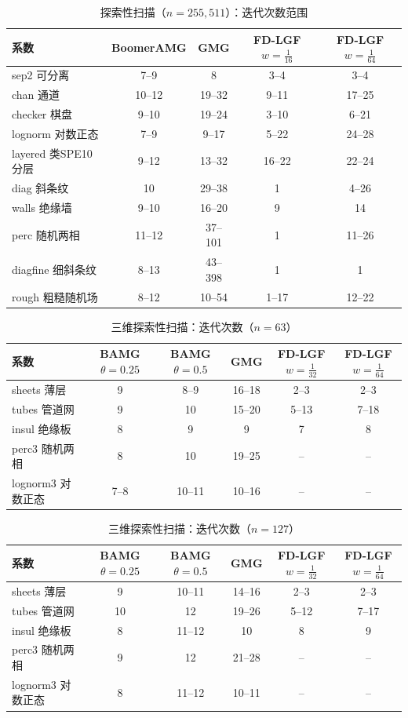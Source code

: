 \begin{table}[H]\centering\small
\caption{探索性扫描（$n=255, 511$）：迭代次数范围}\label{tab:scan}
\begin{tabular}{lcccc}
\toprule
系数 & BoomerAMG & GMG & FD-LGF $w{=}\frac1{16}$ & FD-LGF $w{=}\frac1{64}$ \\
\midrule
sep2 可分离 & 7--9 & 8 & 3--4 & 3--4 \\
chan 通道 & 10--12 & 19--32 & 9--11 & 17--25 \\
checker 棋盘 & 9--10 & 19--24 & 3--10 & 6--21 \\
lognorm 对数正态 & 7--9 & 9--17 & 5--22 & 24--28 \\
layered 类SPE10分层 & 9--12 & 13--32 & 16--22 & 22--24 \\
diag 斜条纹 & 10 & 29--38 & 1 & 4--26 \\
walls 绝缘墙 & 9--10 & 16--20 & 9 & 14 \\
perc 随机两相 & 11--12 & 37--101 & 1 & 11--26 \\
diagfine 细斜条纹 & 8--13 & 43--398 & 1 & 1 \\
rough 粗糙随机场 & 8--12 & 10--54 & 1--17 & 12--22 \\
\bottomrule
\end{tabular}
\end{table}

\begin{table}[H]\centering\small
\caption{三维探索性扫描：迭代次数（$n=63$）}\label{tab:s3its63}
\begin{tabular}{lccccc}
\toprule
系数 & BAMG $\theta{=}0.25$ & BAMG $\theta{=}0.5$ & GMG & FD-LGF $w{=}\frac1{32}$ & FD-LGF $w{=}\frac1{64}$ \\
\midrule
sheets 薄层 & 9 & 8--9 & 16--18 & 2--3 & 2--3 \\
tubes 管道网 & 9 & 10 & 15--20 & 5--13 & 7--18 \\
insul 绝缘板 & 8 & 9 & 9 & 7 & 8 \\
perc3 随机两相 & 8 & 10 & 19--25 & -- & -- \\
lognorm3 对数正态 & 7--8 & 10--11 & 10--16 & -- & -- \\
\bottomrule
\end{tabular}
\end{table}

\begin{table}[H]\centering\small
\caption{三维探索性扫描：迭代次数（$n=127$）}\label{tab:s3its127}
\begin{tabular}{lccccc}
\toprule
系数 & BAMG $\theta{=}0.25$ & BAMG $\theta{=}0.5$ & GMG & FD-LGF $w{=}\frac1{32}$ & FD-LGF $w{=}\frac1{64}$ \\
\midrule
sheets 薄层 & 9 & 10--11 & 14--16 & 2--3 & 2--3 \\
tubes 管道网 & 10 & 12 & 19--26 & 5--12 & 7--17 \\
insul 绝缘板 & 8 & 11--12 & 10 & 8 & 9 \\
perc3 随机两相 & 9 & 12 & 21--28 & -- & -- \\
lognorm3 对数正态 & 8 & 11--12 & 10--11 & -- & -- \\
\bottomrule
\end{tabular}
\end{table}

